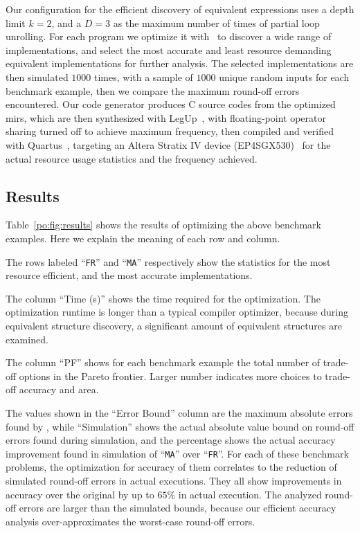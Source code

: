 Our configuration for the efficient discovery of equivalent expressions uses a
depth limit $k = 2$, and a $D = 3$ as the maximum number of times of partial
loop unrolling.  For each program we optimize it with \soap~to discover a wide
range of implementations, and select the most accurate and least resource
demanding equivalent implementations for further analysis.  The selected
implementations are then simulated $1000$ times, with a sample of $1000$ unique
random inputs for each benchmark example, then we compare the maximum round-off
errors encountered.  Our code generator produces C source codes from the
optimized \glspl{mir}, which are then synthesized with LegUp~\cite{legup}, with
floating-point operator sharing turned off to achieve maximum frequency, then
compiled and verified with Quartus~\cite{quartus}, targeting an Altera Stratix
IV device (\textrm{EP4SGX530})~\cite{stratix4} for the actual resource usage
statistics and the frequency achieved.

\subsection{Results}

Table~\ref{po:fig:results} shows the results of optimizing the above benchmark
examples.  Here we explain the meaning of each row and column.

The rows labeled ``\texttt{FR}'' and ``\texttt{MA}'' respectively show
the statistics for the most resource efficient, and the most accurate
implementations.

The column ``Time (s)'' shows the time required for the optimization.  The
optimization runtime is longer than a typical compiler optimizer, because
during equivalent structure discovery, a significant amount of equivalent
structures are examined.

The column ``PF'' shows for each benchmark example the total number of
trade-off options in the Pareto frontier.  Larger number indicates more choices
to trade-off accuracy and area.

The values shown in the ``Error Bound'' column are the maximum absolute
errors found by \soap, while ``Simulation'' shows the actual absolute value
bound on round-off errors found during simulation, and the percentage shows
the actual accuracy improvement found in simulation of ``\texttt{MA}'' over
``\texttt{FR}''.  For each of these benchmark problems, the optimization for
accuracy of them correlates to the reduction of simulated round-off errors in
actual executions.  They all show improvements in accuracy over the original
by up to $65\%$ in actual execution.  The analyzed round-off errors are
larger than the simulated bounds, because our efficient accuracy analysis
over-approximates the worst-case round-off errors.

